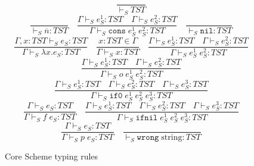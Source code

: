 \begin{figure}[p]
\[
\frac{}{\vdash_{S}TST}
\]
\bigskip
\[
\frac{}{\vdash_{S}\overline{n}:TST}
\quad
\frac{\Gamma\vdash_{S}e_{S}^{1}:TST\quad\Gamma\vdash_{S}e_{S}^{2}:TST}{\Gamma\vdash_{S}\mathtt{cons}\;e_{S}^{1}\;e_{S}^{2}:TST}
\quad
\frac{}{\vdash_{S}\mathtt{nil}:TST}
\]
\[
\frac{\Gamma,x:TST\vdash_{S}e_{S}:TST}{\Gamma\vdash_{S}\lambda x.e_{S}:TST}
\quad
\frac{x:TST\in\Gamma}{\Gamma\vdash_{S}x:TST}
\quad
\frac{\Gamma\vdash_{S}e_{S}^{1}:TST\quad\Gamma\vdash_{S}e_{S}^{2}:TST}{\Gamma\vdash_{S}e_{S}^{1}\;e_{S}^{2}:TST}
\]
\[
\frac{\Gamma\vdash_{S}e_{S}^{1}:TST\quad\Gamma\vdash_{S}e_{S}^{2}:TST}{\Gamma\vdash_{S}o\;e_{S}^{1}\;e_{S}^{2}:TST}
\]
\[
\frac{\Gamma\vdash_{S}e_{S}^{1}:TST\quad\Gamma\vdash_{S}e_{S}^{2}:TST\quad\Gamma\vdash_{S}e_{S}^{3}:TST}{\Gamma\vdash_{S}\mathtt{if0}\;e_{S}^{1}\;e_{S}^{2}\;e_{S}^{3}:TST}
\]
\[
\frac{\Gamma\vdash_{S}e_{S}:TST}{\Gamma\vdash_{S}f\;e_{S}:TST}
\quad
\frac{\Gamma\vdash_{S}e_{S}^{1}:TST\quad\Gamma\vdash_{S}e_{S}^{2}:TST\quad\Gamma\vdash_{S}e_{S}^{3}:TST}{\Gamma\vdash_{S}\mathtt{ifnil}\;e_{S}^{1}\;e_{S}^{2}\;e_{S}^{3}:TST}
\]
\[
\frac{\Gamma\vdash_{S}e_{S}:TST}{\Gamma\vdash_{S}p\;e_{S}:TST}
\quad
\frac{}{\vdash_{S}\mathtt{wrong}\;\mathrm{string}:TST}
\]
\caption{Core Scheme typing rules}
\label{cstr}
\end{figure}